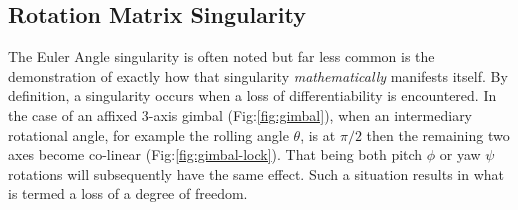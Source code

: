 \subsection{Rotation Matrix Singularity}\label{subsec:dynamics.rigidbody.singularity}
The Euler Angle singularity is often noted but far less common is the demonstration of exactly how that singularity \emph{mathematically} manifests itself. By definition, a singularity occurs when a loss of differentiability is encountered. In the case of an affixed 3-axis gimbal (Fig:\ref{fig:gimbal}), when an intermediary rotational angle, for example the rolling angle $\theta$, is at $\pi/2$ then the remaining two axes become co-linear (Fig:\ref{fig:gimbal-lock}). That being both pitch $\phi$ or yaw $\psi$ rotations will subsequently have the same effect. Such a situation results in what is termed a loss of a degree of freedom.
